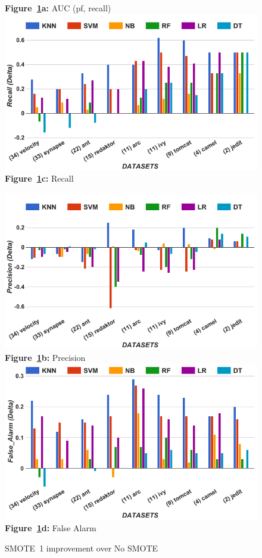 \begin{figure}[!t]
\begin{minipage}{.5\linewidth}
  {\bf Figure~\ref{fig:untuned}a:} AUC (pf, recall)
        \includegraphics[width=.95\linewidth]{./fig/Recall_untuned.png}
  {\bf Figure~\ref{fig:untuned}c:} Recall
    \end{minipage}%
\begin{minipage}{.5\linewidth}
        \centering
        \includegraphics[width=.95\linewidth]{./fig/prec_untuned.png}
  {\bf Figure~\ref{fig:untuned}b:} Precision
        \includegraphics[width=.95\linewidth]{./fig/pf_untuned.png}
  {\bf Figure~\ref{fig:untuned}d:} False Alarm
    \end{minipage}%
    \caption{SMOTE~1 improvement over No SMOTE}
    \label{fig:untuned}
\end{figure}

